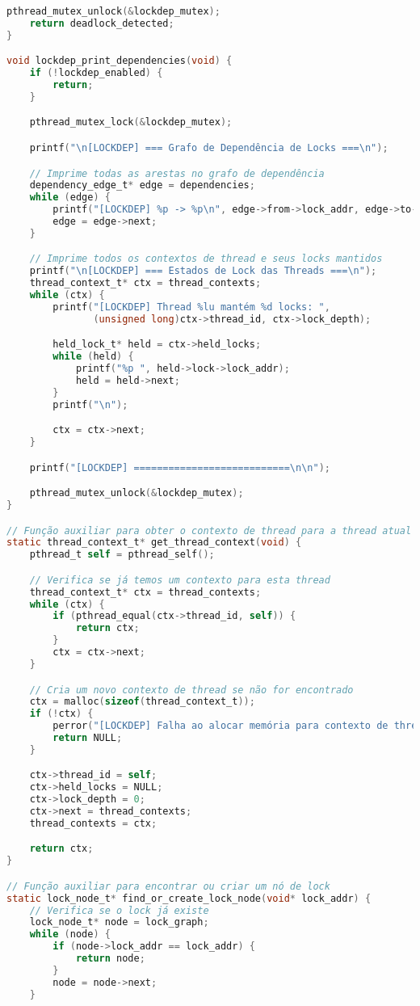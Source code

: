 \begin{lstlisting}[language=C, caption={lockdep\_core.c - Implementação do sistema de detecção de deadlocks}]
    pthread_mutex_unlock(&lockdep_mutex);
    return deadlock_detected;
}

void lockdep_print_dependencies(void) {
    if (!lockdep_enabled) {
        return;
    }

    pthread_mutex_lock(&lockdep_mutex);

    printf("\n[LOCKDEP] === Grafo de Dependência de Locks ===\n");

    // Imprime todas as arestas no grafo de dependência
    dependency_edge_t* edge = dependencies;
    while (edge) {
        printf("[LOCKDEP] %p -> %p\n", edge->from->lock_addr, edge->to->lock_addr);
        edge = edge->next;
    }

    // Imprime todos os contextos de thread e seus locks mantidos
    printf("\n[LOCKDEP] === Estados de Lock das Threads ===\n");
    thread_context_t* ctx = thread_contexts;
    while (ctx) {
        printf("[LOCKDEP] Thread %lu mantém %d locks: ",
               (unsigned long)ctx->thread_id, ctx->lock_depth);

        held_lock_t* held = ctx->held_locks;
        while (held) {
            printf("%p ", held->lock->lock_addr);
            held = held->next;
        }
        printf("\n");

        ctx = ctx->next;
    }

    printf("[LOCKDEP] ===========================\n\n");

    pthread_mutex_unlock(&lockdep_mutex);
}

// Função auxiliar para obter o contexto de thread para a thread atual
static thread_context_t* get_thread_context(void) {
    pthread_t self = pthread_self();

    // Verifica se já temos um contexto para esta thread
    thread_context_t* ctx = thread_contexts;
    while (ctx) {
        if (pthread_equal(ctx->thread_id, self)) {
            return ctx;
        }
        ctx = ctx->next;
    }

    // Cria um novo contexto de thread se não for encontrado
    ctx = malloc(sizeof(thread_context_t));
    if (!ctx) {
        perror("[LOCKDEP] Falha ao alocar memória para contexto de thread");
        return NULL;
    }

    ctx->thread_id = self;
    ctx->held_locks = NULL;
    ctx->lock_depth = 0;
    ctx->next = thread_contexts;
    thread_contexts = ctx;

    return ctx;
}

// Função auxiliar para encontrar ou criar um nó de lock
static lock_node_t* find_or_create_lock_node(void* lock_addr) {
    // Verifica se o lock já existe
    lock_node_t* node = lock_graph;
    while (node) {
        if (node->lock_addr == lock_addr) {
            return node;
        }
        node = node->next;
    }


\end{lstlisting}
